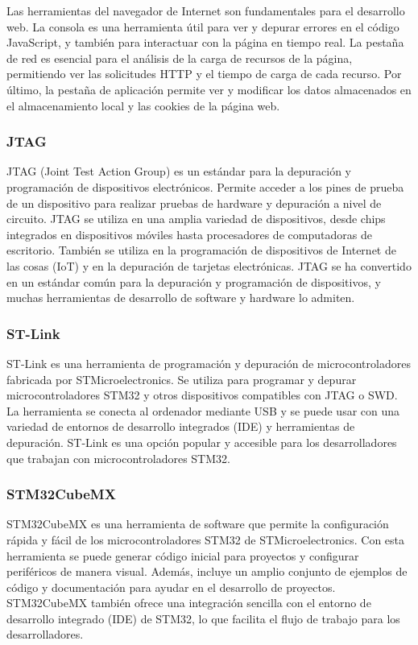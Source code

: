 Las herramientas del navegador de Internet son fundamentales para el desarrollo web. La consola es una herramienta útil para ver y depurar errores en el código JavaScript, y también para interactuar con la página en tiempo real. La pestaña de red es esencial para el análisis de la carga de recursos de la página, permitiendo ver las solicitudes HTTP y el tiempo de carga de cada recurso. Por último, la pestaña de aplicación permite ver y modificar los datos almacenados en el almacenamiento local y las cookies de la página web.


\subsubsection{JTAG}

JTAG (Joint Test Action Group) es un estándar para la depuración y programación de dispositivos electrónicos. Permite acceder a los pines de prueba de un dispositivo para realizar pruebas de hardware y depuración a nivel de circuito. JTAG se utiliza en una amplia variedad de dispositivos, desde chips integrados en dispositivos móviles hasta procesadores de computadoras de escritorio. También se utiliza en la programación de dispositivos de Internet de las cosas (IoT) y en la depuración de tarjetas electrónicas. JTAG se ha convertido en un estándar común para la depuración y programación de dispositivos, y muchas herramientas de desarrollo de software y hardware lo admiten.


\subsubsection{ST-Link}

ST-Link es una herramienta de programación y depuración de microcontroladores fabricada por STMicroelectronics. Se utiliza para programar y depurar microcontroladores STM32 y otros dispositivos compatibles con JTAG o SWD. La herramienta se conecta al ordenador mediante USB y se puede usar con una variedad de entornos de desarrollo integrados (IDE) y herramientas de depuración. ST-Link es una opción popular y accesible para los desarrolladores que trabajan con microcontroladores STM32.


\subsubsection{STM32CubeMX}

STM32CubeMX es una herramienta de software que permite la configuración rápida y fácil de los microcontroladores STM32 de STMicroelectronics. Con esta herramienta se puede generar código inicial para proyectos y configurar periféricos de manera visual. Además, incluye un amplio conjunto de ejemplos de código y documentación para ayudar en el desarrollo de proyectos. STM32CubeMX también ofrece una integración sencilla con el entorno de desarrollo integrado (IDE) de STM32, lo que facilita el flujo de trabajo para los desarrolladores.


